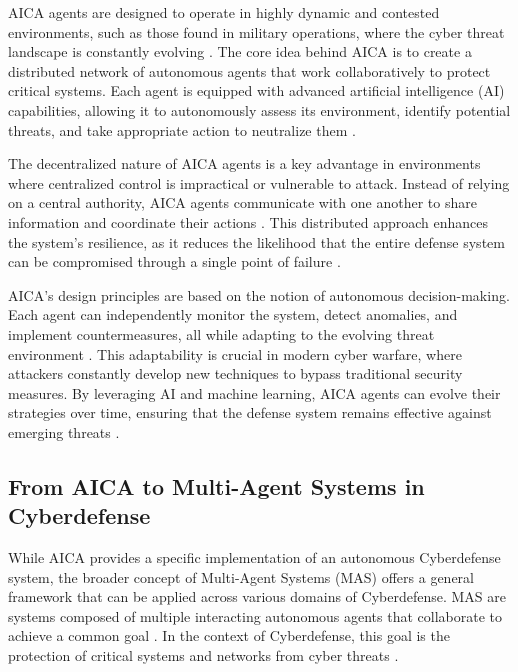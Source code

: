 AICA agents are designed to operate in highly dynamic and contested environments, such as those found in military operations, where the cyber threat landscape is constantly evolving \cite{kott2018towards}. The core idea behind AICA is to create a distributed network of autonomous agents that work collaboratively to protect critical systems. Each agent is equipped with advanced artificial intelligence (AI) capabilities, allowing it to autonomously assess its environment, identify potential threats, and take appropriate action to neutralize them \cite{kott2023autonomous}.

The decentralized nature of AICA agents is a key advantage in environments where centralized control is impractical or vulnerable to attack. Instead of relying on a central authority, AICA agents communicate with one another to share information and coordinate their actions \cite{kott2018autonomous}. This distributed approach enhances the system's resilience, as it reduces the likelihood that the entire defense system can be compromised through a single point of failure \cite{kott2023autonomous}.

AICA's design principles are based on the notion of autonomous decision-making. Each agent can independently monitor the system, detect anomalies, and implement countermeasures, all while adapting to the evolving threat environment \cite{kott2018towards}. This adaptability is crucial in modern cyber warfare, where attackers constantly develop new techniques to bypass traditional security measures. By leveraging AI and machine learning, AICA agents can evolve their strategies over time, ensuring that the defense system remains effective against emerging threats \cite{chatterjee2023collaboration}.

\subsection{From AICA to Multi-Agent Systems in Cyberdefense}

While AICA provides a specific implementation of an autonomous Cyberdefense system, the broader concept of Multi-Agent Systems (MAS) offers a general framework that can be applied across various domains of Cyberdefense. MAS are systems composed of multiple interacting autonomous agents that collaborate to achieve a common goal \cite{kott2018towards}. In the context of Cyberdefense, this goal is the protection of critical systems and networks from cyber threats \cite{jajodia2017autonomous}.

